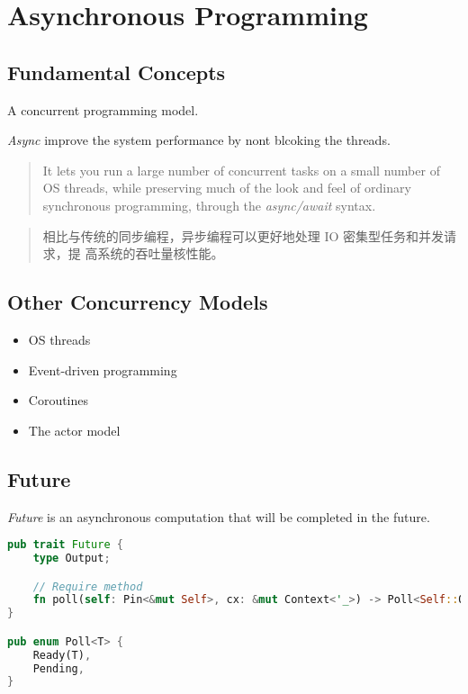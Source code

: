 \chapter{Asynchronous Programming}

\section{Fundamental Concepts}
\begin{definition}
	A concurrent programming model. 
\end{definition}

\emph{Async} improve the system performance by nont blcoking the threads.

\begin{tcolorbox}
	\begin{quotation}
		It lets you run a large number of concurrent tasks on a small number of OS threads, 
		while preserving much of the look and feel of ordinary synchronous programming, 
		through the \emph{async/await} syntax.
	\end{quotation}
\end{tcolorbox}
\begin{tcolorbox}
	\begin{quotation}
		相比与传统的同步编程，异步编程可以更好地处理 IO 密集型任务和并发请求，提
		高系统的吞吐量核性能。
	\end{quotation}
\end{tcolorbox}

\section{Other Concurrency Models}
\begin{itemize}
	\item OS threads
	\item Event-driven programming
	\item Coroutines
	\item The actor model
\end{itemize}

\section{Future}
\emph{Future} is an asynchronous computation that will be completed in the future. 
\begin{lstlisting}[language=rust, style=boxed]
pub trait Future {
	type Output;

	// Require method
	fn poll(self: Pin<&mut Self>, cx: &mut Context<'_>) -> Poll<Self::Output>;
}

pub enum Poll<T> {
    Ready(T),
    Pending,
}
\end{lstlisting}

